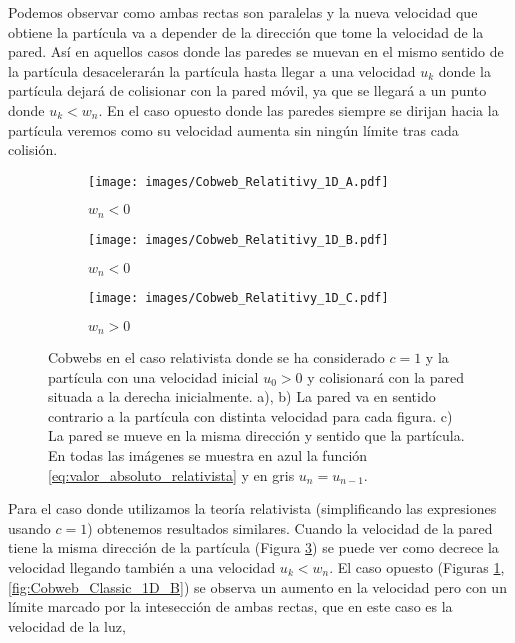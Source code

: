 \documentclass[11pt, spanish]{book}
\begin{document}
Podemos observar como ambas rectas son paralelas y la nueva velocidad que obtiene la partícula va a depender de la dirección que tome la velocidad de la pared. Así en aquellos casos donde las paredes se muevan en el mismo sentido de la partícula desacelerarán la partícula hasta llegar a una velocidad \( u_k \) donde la partícula dejará de colisionar con la pared móvil, ya que se llegará a un punto donde \( u_k < w_n \). En el caso opuesto donde las paredes siempre se dirijan hacia la partícula veremos como su velocidad aumenta sin ningún límite tras cada colisión. 

\vspace{3mm}

\begin{figure}[H]
    \centering
    \begin{subfigure}[b]{0.3\textwidth}
        \centering
        \texttt{[image: images/Cobweb\_Relatitivy\_1D\_A.pdf]}
        \caption{$w_n<0$}
        \label{fig:Cobweb_Rel_1D_A}
    \end{subfigure}
    \hfill
    \begin{subfigure}[b]{0.3\textwidth}
        \centering
        \texttt{[image: images/Cobweb\_Relatitivy\_1D\_B.pdf]}
        \caption{$w_n<0$}
        \label{fig:Cobweb_Rel_1D_B}
    \end{subfigure}
    \hfill
    \begin{subfigure}[b]{0.3\textwidth}
        \centering
        \texttt{[image: images/Cobweb\_Relatitivy\_1D\_C.pdf]}
        \caption{$w_n>0$}
        \label{fig:Cobweb_Rel_1D_C}
    \end{subfigure}
    \caption{Cobwebs en el caso relativista donde se ha considerado \( c=1 \) y la partícula  con una velocidad inicial $u_0 > 0$ y colisionará con la pared situada a la derecha inicialmente. a), b) La pared va en sentido contrario a la partícula con distinta velocidad para cada figura. c) La pared se mueve en la misma dirección y sentido que la partícula. En todas las imágenes se muestra en azul la función \ref{eq:valor_absoluto_relativista} y en gris \( u_n = u_{n-1} \).}
        \label{fig:Cobweb_Rel_1D}
\end{figure}

Para el caso donde utilizamos la teoría relativista (simplificando las expresiones usando \( c = 1\)) obtenemos resultados similares. Cuando la velocidad de la pared tiene la misma dirección de la partícula (Figura \ref{fig:Cobweb_Rel_1D_C}) se puede ver como decrece la velocidad llegando también a una velocidad \( u_k < w_n \). El caso opuesto (Figuras \ref{fig:Cobweb_Rel_1D_A}, \ref{fig:Cobweb_Classic_1D_B}) se observa un aumento en la velocidad pero con un límite marcado por la intesección de ambas rectas, que en este caso es la velocidad de la luz,
\end{document}
